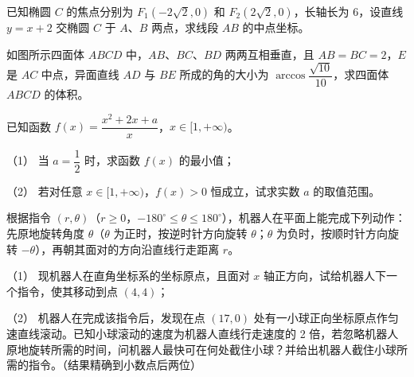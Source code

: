 \begin{question}
已知椭圆 $C$ 的焦点分别为 $F_1(-2\sqrt{2},0)$ 和 $F_2(2\sqrt{2},0)$，长轴长为 6，设直线 $y=x+2$ 交椭圆 $C$ 于 $A$、$B$ 两点，求线段 $AB$ 的中点坐标。

\Needspace{0.4\textheight}
\end{question}
\begin{question}
如图所示四面体 $ABCD$ 中，$AB$、$BC$、$BD$ 两两互相垂直，且 $AB=BC=2$，$E$ 是 $AC$ 中点，异面直线 $AD$ 与 $BE$ 所成的角的大小为 $\arccos\dfrac{\sqrt{10}}{10}$，求四面体 $ABCD$ 的体积。
\nopagebreak[4]
\begin{center}\end{center}
\nopagebreak[4]
\end{question}
\begin{question}
已知函数 $f(x)=\dfrac{x^2+2x+a}{x}$，$x\in[1,+\infty)$。

（1） 当 $a=\dfrac{1}{2}$ 时，求函数 $f(x)$ 的最小值；

（2） 若对任意 $x\in[1,+\infty)$，$f(x)>0$ 恒成立，试求实数 $a$ 的取值范围。

\Needspace{0.4\textheight}
\end{question}
\begin{question}
根据指令 $(r,\theta)$（$r\geq 0$，$-180^\circ\leq\theta\leq180^\circ$），机器人在平面上能完成下列动作：先原地旋转角度 $\theta$（$\theta$ 为正时，按逆时针方向旋转 $\theta$；$\theta$ 为负时，按顺时针方向旋转 $-\theta$），再朝其面对的方向沿直线行走距离 $r$。

（1） 现机器人在直角坐标系的坐标原点，且面对 $x$ 轴正方向，试给机器人下一个指令，使其移动到点 $(4,4)$；

（2） 机器人在完成该指令后，发现在点 $(17,0)$ 处有一小球正向坐标原点作匀速直线滚动。已知小球滚动的速度为机器人直线行走速度的 2 倍，若忽略机器人原地旋转所需的时间，问机器人最快可在何处截住小球？并给出机器人截住小球所需的指令。（结果精确到小数点后两位）
\nopagebreak[4]
\begin{center}\end{center}
\nopagebreak[4]
\end{question}
